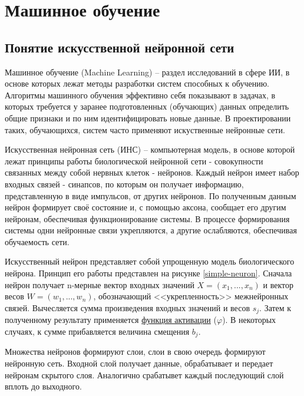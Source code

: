 
\section{Машинное обучение}

\subsection{Понятие искусственной нейронной сети}

Машинное обучение (Machine Learning) – раздел исследований в сфере ИИ, в основе которых лежат методы разработки систем способных к обучению. Алгоритмы машинного обучения эффективно себя показывают в задачах, в которых требуется у заранее подготовленных (обучающих) данных определить общие признаки и по ним идентифицировать новые данные. В проектировании таких, обучающихся, систем часто применяют искуственные нейронные сети. 

Искусственная нейронная сеть (ИНС) – компьютерная модель, в основе которой лежат принципы работы биологической нейронной сети - совокупности связанных между собой нервных клеток - нейронов. Каждый нейрон имеет набор входных связей - синапсов, по которым он получает информацию, представленную в виде импульсов, от других нейронов. По полученным данным нейрон формирует своё состояние и, с помощью аксона, сообщает его другим нейронам, обеспечивая функционирование системы. В процессе формирования системы одни нейронные связи укрепляются, а другие ослабляются, обеспечивая обучаемость сети.

Искусственный нейрон представляет собой упрощенную модель биологического нейрона. Принцип его работы представлен на рисунке \ref{simple-neuron}. Сначала нейрон получает n-мерные вектор входных значений $X=(x_{1},...,x_{n})$ и вектор весов $W=(w_{1},...,w_{n})$, обозначающий <<укрепленность>> межнейронных связей. Вычесляется сумма произведения входных значений и весов $s_j$. Затем к полученному результату применяется \hyperref[sec:activation]{функция активации} ($\varphi$). В некоторых случаях, к сумме прибавляется величина смещения $b_j$.


Множества нейронов формируют слои, слои в свою очередь формируют нейронную сеть. Входной слой получает данные, обрабатывает и передает нейронам скрытого слоя. Аналогично срабатывет каждый последующий слой вплоть до выходного. 


